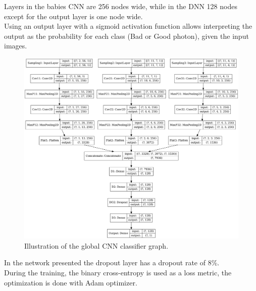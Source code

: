 Layers in the babies CNN are 256 nodes wide, while in the DNN 128 nodes except for the output layer is one node wide.\\
Using an output layer with a sigmoid activation function allows interpreting the output as the probability for each class (Bad or Good photon), given the input images.\\
\begin{figure}[htbp]
    \centering
    \includegraphics[width=1.\textwidth]{Ch3/Img/CNN_model.png}
    \caption{Illustration of the global CNN classifier graph.}
    \label{fig:gamma:CNN:Model:Arch}
\end{figure}
In the network presented the dropout layer has a dropout rate of 8\%.\\
During the training, the binary cross-entropy is used as a loss metric, the optimization is done with Adam optimizer.
